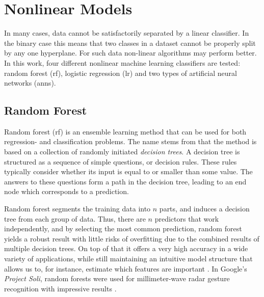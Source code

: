 \section{Nonlinear Models}

In many cases, data cannot be satisfactorily separated by a linear classifier. In the binary case this means that two classes in a dataset cannot be properly split by any one hyperplane. For such data non-linear algorithms may perform better. In this work, four different nonlinear machine learning classifiers are tested: random forest (\gls{rf}), logistic regression (\gls{lr}) and two types of artificial neural networks (\gls{ann}s). 



\subsection{Random Forest}
Random forest (\gls{rf}) is an ensemble learning method that can be used for both regression- and classification problems. The name stems from that the method is based on a collection of randomly initiated \textit{decision trees}. A decision tree is structured as a sequence of simple questions, or decision rules. These rules typically consider whether its input is equal to or smaller than some value. The answers to these questions form a path in the decision tree, leading to an end node which corresponds to a prediction.

Random forest segments the training data into $n$ parts, and induces a decision tree from each group of data. Thus, there are $n$ predictors that work independently, and by selecting the most common prediction, random forest yields a robust result with little risks of overfitting due to the combined results of multiple decision trees. On top of that it offers a very high accuracy in a wide variety of applications, while still maintaining an intuitive model structure that allows us to, for instance, estimate which features are important \citep{breiman_2002}. In Google's \emph{Project Soli}, random forests were used for millimeter-wave radar gesture recognition with impressive results \citep{lien_gillian_karagozler_amihood_schwesig_olson_raja_poupyrev_2016}. 

